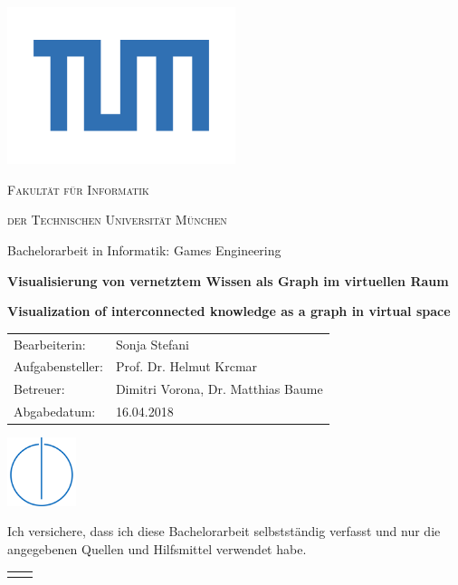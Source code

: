\documentclass[12pt, a4paper]{article}
\begin{document}
\begin{titlepage}
\centering
\includegraphics[width=0.5\textwidth]{TUM_Logo.png}\par
{\scshape\LARGE Fakultät für Informatik\par}
{\scshape\Large der Technischen Universität München\par}
\vfill
{\large Bachelorarbeit in Informatik: Games Engineering\par}
\vfill
{\LARGE\bfseries Visualisierung von vernetztem Wissen als Graph im virtuellen Raum\par\vspace{0.5cm}}
{\LARGE\bfseries Visualization of interconnected knowledge as a graph in virtual space\par}
\vfill
\begin{tabular}{l l}
	Bearbeiterin:		& Sonja Stefani \\
	Aufgabensteller:	& Prof. Dr. Helmut Krcmar \\
	Betreuer:			& Dimitri Vorona, Dr. Matthias Baume \\
	Abgabedatum:		& 16.04.2018
\end{tabular}\par
\vfill
\includegraphics[width=0.15\textwidth]{Informatik_Fakultaet_Logo.png}
\end{titlepage}
\begin{titlepage}
\begin{flushleft}
{\large Ich versichere, dass ich diese Bachelorarbeit selbstständig verfasst und nur die angegebenen Quellen und Hilfsmittel verwendet habe.\par\vspace{2cm}}
\begin{tabular}{l l}
\underline{\hspace{4cm}} & \underline{\hspace{4cm}}
\end{tabular}
\end{flushleft}

\end{titlepage}
\end{document}
